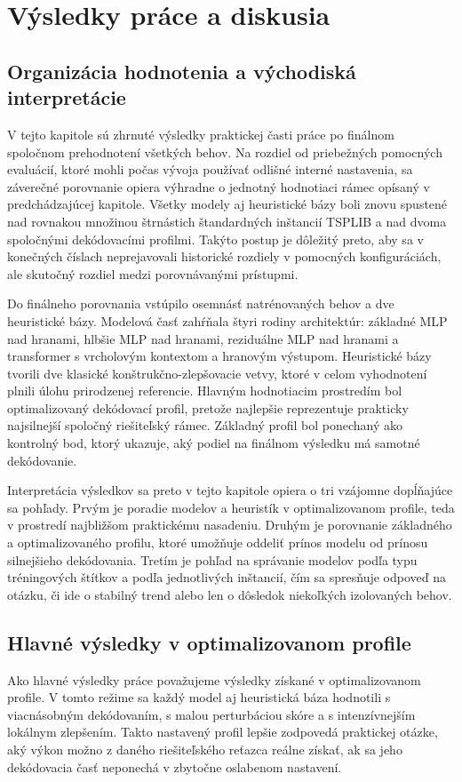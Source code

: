 \chapter{Výsledky práce a diskusia}
\label{chap:vysledky}

\section{Organizácia hodnotenia a východiská interpretácie}
\indent V tejto kapitole sú zhrnuté výsledky praktickej časti práce po finálnom
spoločnom prehodnotení všetkých behov. Na rozdiel od priebežných pomocných
evaluácií, ktoré mohli počas vývoja používať odlišné interné nastavenia, sa
záverečné porovnanie opiera výhradne o jednotný hodnotiaci rámec opísaný v
predchádzajúcej kapitole. Všetky modely aj heuristické bázy boli znovu
spustené nad rovnakou množinou štrnástich štandardných inštancií TSPLIB a nad
dvoma spoločnými dekódovacími profilmi. Takýto postup je dôležitý preto, aby sa
v konečných číslach neprejavovali historické rozdiely v pomocných konfiguráciách,
ale skutočný rozdiel medzi porovnávanými prístupmi.

\indent Do finálneho porovnania vstúpilo osemnásť natrénovaných behov a dve
heuristické bázy. Modelová časť zahŕňala štyri rodiny architektúr: základné
MLP nad hranami, hlbšie MLP nad hranami, reziduálne MLP nad hranami a
transformer s vrcholovým kontextom a hranovým výstupom. Heuristické bázy tvorili
dve klasické konštrukčno-zlepšovacie vetvy, ktoré v celom vyhodnotení plnili
úlohu prirodzenej referencie. Hlavným hodnotiacim prostredím bol optimalizovaný
dekódovací profil, pretože najlepšie reprezentuje prakticky najsilnejší spoločný
riešiteľský rámec. Základný profil bol ponechaný ako kontrolný bod, ktorý
ukazuje, aký podiel na finálnom výsledku má samotné dekódovanie.

\indent Interpretácia výsledkov sa preto v tejto kapitole opiera o tri
vzájomne dopĺňajúce sa pohľady. Prvým je poradie modelov a heuristík v
optimalizovanom profile, teda v prostredí najbližšom praktickému nasadeniu.
Druhým je porovnanie základného a optimalizovaného profilu, ktoré umožňuje
oddeliť prínos modelu od prínosu silnejšieho dekódovania. Tretím je pohľad na
správanie modelov podľa typu tréningových štítkov a podľa jednotlivých
inštancií, čím sa spresňuje odpoveď na otázku, či ide o stabilný trend alebo len
o dôsledok niekoľkých izolovaných behov.

\section{Hlavné výsledky v optimalizovanom profile}
\indent Ako hlavné výsledky práce považujeme výsledky získané v optimalizovanom
profile. V tomto režime sa každý model aj heuristická báza hodnotili s
viacnásobným dekódovaním, s malou perturbáciou skóre a s intenzívnejším
lokálnym zlepšením. Takto nastavený profil lepšie zodpovedá praktickej otázke,
aký výkon možno z daného riešiteľského reťazca reálne získať, ak sa jeho
dekódovacia časť neponechá v zbytočne oslabenom nastavení.

